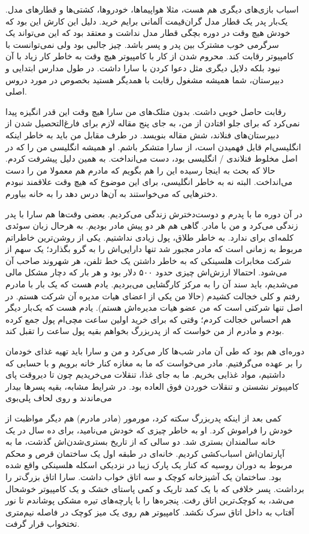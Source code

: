 اسباب‌ بازی‌های دیگری هم هست،‌ مثلا هواپیماها، خودروها، کشتی‌ها و قطارهای
مدل. یک‌بار پدر یک قطار مدل گران‌قیمت آلمانی برایم خرید. دلیل این کارش
این بود که خودش هیچ وقت در دوره بچگی قطار مدل نداشت و معتقد بود که این
می‌تواند یک سرگرمی خوب مشترک بین پدر و پسر باشد. چیز جالبی بود ولی
نمی‌توانست با کامپیوتر رقابت کند. محروم شدن از کار با کامپیوتر هیچ وقت
به خاطر کار زیاد با آن نبود بلکه دلایل دیگری مثل دعوا کردن با سارا
داشت. در طول مدارس ابتدایی و دبیرستان، شما همیشه مشغول رقابت با همدیگر
هستید بخصوص در مورد دروس اصلی.

رقابت حاصل خوبی داشت. بدون متلک‌های من سارا هیچ وقت این قدر انگیزه پیدا
نمی‌کرد که برای جلو افتادن از من، به جای پنج مقاله لازم برای
فارغ‌التحصیل شدن از دبیرستان‌های فنلاند، شش مقاله بنویسد. در طرف مقابل
من باید به خاطر اینکه انگلیسی‌ام قابل فهمیدن است، از سارا متشکر
باشم. او همیشه انگلیسی من را که در اصل مخلوط فنلاندی / انگلیسی بود،
دست می‌انداخت. به همین دلیل پیشرفت کردم. حالا که بحث به اینجا رسیده این
را هم بگویم که مادرم هم معمولا من را دست می‌انداخت. البته نه به خاطر
انگلیسی، برای این موضوع که هیچ وقت علاقمند نبودم دخترهایی که می‌خواستند
 به آن‌ها درس دهد را به خانه بیاورم.

در آن دوره ما با پدرم و دوست‌دخترش زندگی می‌کردیم. بعضی وقت‌ها هم سارا با
پدر زندگی می‌کرد و من با مادر. گاهی هم هر دو پیش مادر بودیم. به هرحال
زبان سوئدی کلمه‌ای برای  ندارد. به خاطر طلاق،
پول زیادی نداشتیم. یکی از روشن‌ترین خاطراتم مربوط به زمانی است که مادر
مجبور شد تنها دارایی‌اش را به گرو بگذارد؛ یک سهم از شرکت مخابرات
هلسینکی که به خاطر داشتن یک خط تلفن، هر شهروند صاحب آن می‌شود. احتمالا
ارزش‌اش چیزی حدود ۵۰۰ دلار بود و هر بار که دچار مشکل مالی می‌شدیم،‌ باید
سند آن را به مرکز کارگشایی می‌بردیم. یادم هست که یک بار با مادرم رفتم و
کلی خجالت کشیدم (حالا من یکی از اعضای هیات مدیره آن شرکت هستم. در اصل
تنها شرکتی است که من عضو هیات مدیره‌اش هستم). یادم هست که یک‌بار دیگر هم
احساس خجالت کردم؛ وقتی که برای خرید اولین ساعت مچی‌ام پول جمع کرده‌ بودم
و مادرم از من خواست که از پدربزرگ بخواهم بقیه پول ساعت را تقبل کند.

دوره‌ای هم بود که طی آن مادر شب‌ها کار می‌کرد و من و سارا باید تهیه غذای
خودمان را بر عهده می‌گرفتیم. مادر می‌خواست که ما به مغازه کنار خانه
برویم و با حسابی که داشتیم، مواد غذایی بخریم. ما به جای غذا، تنقلات
می‌خریدیم چون تا دیروقت پای کامپیوتر نشستن و تنقلات خوردن فوق العاده
بود. در شرایط مشابه، بقیه پسرها بیدار می‌ماندند و روی لحاف پلی‌بوی

کمی بعد از اینکه پدربزرگ سکته کرد، مورمور (مادر مادرم) هم دیگر مواظبت
از خودش را فراموش کرد. او به خاطر چیزی که خودش  می‌نامید،
برای ده سال در یک خانه سالمندان بستری شد. دو سالی که از تاریخ
بستری‌شدن‌اش گذشت، ما به آپارتمان‌اش اسباب‌کشی کردیم. خانه‌ای در طبقه اول
یک ساختمان قرص و محکم مربوط به دوران روسیه که کنار یک پارک زیبا در
نزدیکی اسکله هلسینکی واقع شده بود. ساختمان یک آشپزخانه کوچک و سه اتاق
خواب داشت. سارا اتاق بزرگ‌تر را برداشت. پسر خلافی که با یک کمد تاریک و
کمی پاستای خشک و یک کامپیوتر خوشحال می‌شد، به کوچک‌ترین اتاق
رفت. پنجره‌ها را با پارچه‌های تیره مشکی پوشاندم تا نور آفتاب به داخل
اتاق سرک نکشد. کامپیوتر هم روی یک میز کوچک در فاصله نیم‌متری تختخواب
قرار گرفت.

